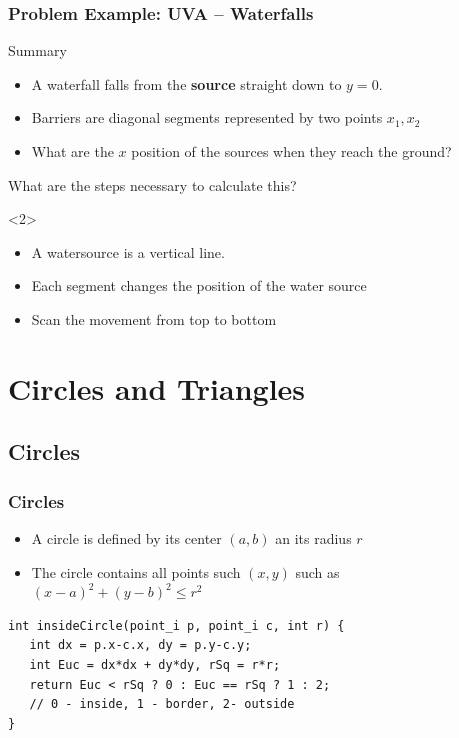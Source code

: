 \documentclass{beamer}
\begin{document}
\begin{frame}
  \frametitle{Problem Example: UVA -- Waterfalls}
  {\small
    \begin{block}{Summary}
      \begin{itemize}
        \item A waterfall falls from the {\bf source} straight down to $y = 0$.
        \item Barriers are diagonal segments represented by two points $x_1, x_2$
        \item What are the $x$ position of the sources when they reach the ground?     
      \end{itemize}
    \end{block}

    \bigskip
    
    What are the steps necessary to calculate this?

    \begin{onlyenv}<2>
      \begin{itemize}
      \item A watersource is a vertical line.
      \item Each segment changes the position of the water source
      \item Scan the movement from top to bottom
      \end{itemize}
    \end{onlyenv}
  }
\end{frame}

\section{Circles and Triangles}
\subsection{Circles}
\begin{frame}[fragile]
  \frametitle{Circles}
  {\smaller
  \begin{itemize}
  \item A circle is defined by its center $(a,b)$ an its radius $r$
  \item The circle contains all points such $(x,y)$ such as $(x-a)^2+(y-b)^2 \leq r^2$
  \end{itemize}

  \begin{exampleblock}{}
\begin{verbatim}
int insideCircle(point_i p, point_i c, int r) {
   int dx = p.x-c.x, dy = p.y-c.y;
   int Euc = dx*dx + dy*dy, rSq = r*r;
   return Euc < rSq ? 0 : Euc == rSq ? 1 : 2; 
   // 0 - inside, 1 - border, 2- outside
}
\end{verbatim}
  \end{exampleblock}
  }
\end{frame}
\end{document}
